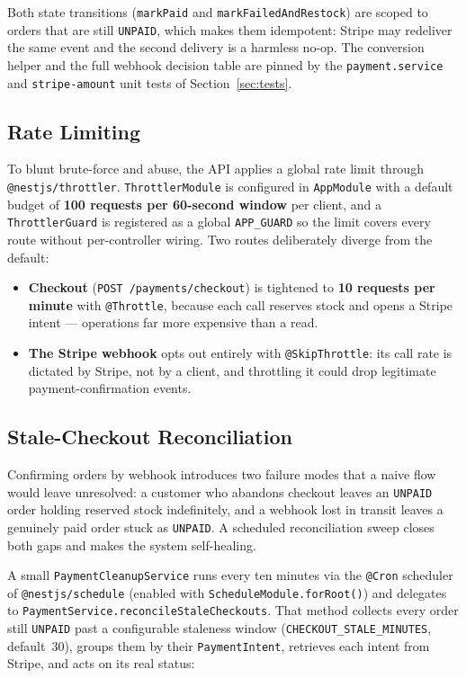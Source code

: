 \documentclass[12pt, a4paper, oneside]{report}
\begin{document}
Both state transitions (\texttt{markPaid} and
\texttt{markFailedAndRestock}) are scoped to orders that are still
\texttt{UNPAID}, which makes them idempotent: Stripe may redeliver the
same event and the second delivery is a harmless no-op. The conversion
helper and the full webhook decision table are pinned by the
\texttt{payment.service} and \texttt{stripe-amount} unit tests of
Section~\ref{sec:tests}.

\subsection{Rate Limiting}

To blunt brute-force and abuse, the API applies a global rate limit
through \texttt{@nestjs/throttler}. \texttt{ThrottlerModule} is
configured in \texttt{AppModule} with a default budget of
\textbf{100 requests per 60-second window} per client, and a
\texttt{ThrottlerGuard} is registered as a global \texttt{APP\_GUARD}
so the limit covers every route without per-controller wiring. Two
routes deliberately diverge from the default:

\begin{itemize}[leftmargin=*,itemsep=2pt]
  \item \textbf{Checkout} (\texttt{POST /payments/checkout}) is
        tightened to \textbf{10 requests per minute} with
        \texttt{@Throttle}, because each call reserves stock and opens a
        Stripe intent --- operations far more expensive than a read.
  \item \textbf{The Stripe webhook} opts out entirely with
        \texttt{@SkipThrottle}: its call rate is dictated by Stripe, not
        by a client, and throttling it could drop legitimate
        payment-confirmation events.
\end{itemize}

\subsection{Stale-Checkout Reconciliation}

Confirming orders by webhook introduces two failure modes that a naive
flow would leave unresolved: a customer who abandons checkout leaves an
\texttt{UNPAID} order holding reserved stock indefinitely, and a webhook
lost in transit leaves a genuinely paid order stuck as \texttt{UNPAID}.
A scheduled reconciliation sweep closes both gaps and makes the system
self-healing.

A small \texttt{PaymentCleanupService} runs every ten minutes via the
\texttt{@Cron} scheduler of \texttt{@nestjs/schedule} (enabled with
\texttt{ScheduleModule.forRoot()}) and delegates to
\texttt{PaymentService.reconcileStaleCheckouts}. That method collects
every order still \texttt{UNPAID} past a configurable staleness window
(\texttt{CHECKOUT\_STALE\_MINUTES}, default~30), groups them by their
\texttt{PaymentIntent}, retrieves each intent from Stripe, and acts on
its real status:
\end{document}
